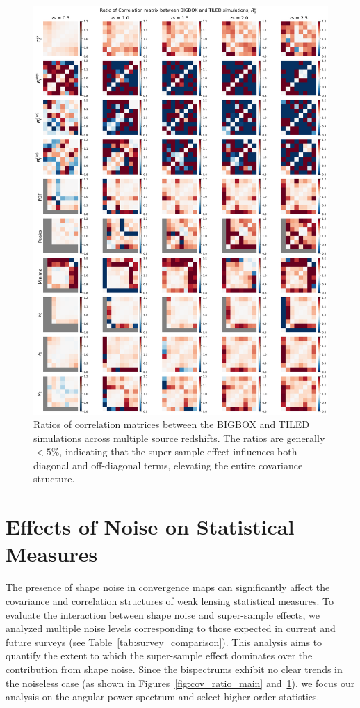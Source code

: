 \begin{figure}[p]
    \centering
    \includegraphics[width=\textwidth]{figures/results/corr_ratio.png}
    \caption[Ratios of Correlation Matrices between BIGBOX and TILED Simulations]{Ratios of correlation matrices between the BIGBOX and TILED simulations across multiple source redshifts. The ratios are generally $< 5\%$, indicating that the super-sample effect influences both diagonal and off-diagonal terms, elevating the entire covariance structure.
    }
    \label{fig:corr_ratio_main}
\end{figure}

\clearpage

\section{Effects of Noise on Statistical Measures}
The presence of shape noise in convergence maps can significantly affect the covariance and correlation structures of weak lensing statistical measures. To evaluate the interaction between shape noise and super-sample effects, we analyzed multiple noise levels corresponding to those expected in current and future surveys (see Table~\ref{tab:survey_comparison}). This analysis aims to quantify the extent to which the super-sample effect dominates over the contribution from shape noise. Since the bispectrums exhibit no clear trends in the noiseless case (as shown in Figures~\ref{fig:cov_ratio_main} and~\ref{fig:corr_ratio_main}), we focus our analysis on the angular power spectrum and select higher-order statistics.

